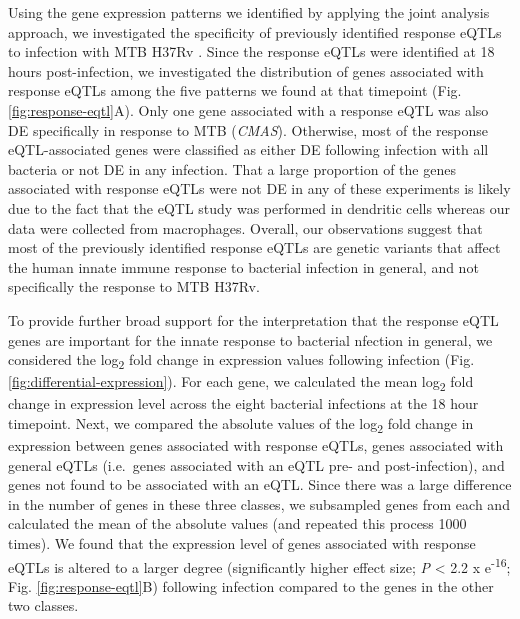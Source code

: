 Using the gene expression patterns we identified by applying the joint
analysis approach, we investigated the specificity of previously
identified response eQTLs to infection with MTB H37Rv
\citep{Barreiro2012}. Since the response eQTLs were identified at 18
hours post-infection, we investigated the distribution of genes
associated with response eQTLs among the five patterns we found at
that timepoint (Fig. \ref{fig:response-eqtl}A). Only one gene
associated with a response eQTL was also DE specifically in response
to MTB (\emph{CMAS}). Otherwise, most of the response eQTL-associated
genes were classified as either DE following infection with all
bacteria or not DE in any infection. That a large proportion of the
genes associated with response eQTLs were not DE in any of these
experiments is likely due to the fact that the eQTL study was
performed in dendritic cells whereas our data were collected from
macrophages. Overall, our observations suggest that most of the
previously identified response eQTLs are genetic variants that affect
the human innate immune response to bacterial infection in general,
and not specifically the response to MTB H37Rv.

To provide further broad support for the interpretation that the
response eQTL genes are important for the innate response to bacterial
nfection in general, we considered the log\textsubscript{2} fold
change in expression values following infection
(Fig. \ref{fig:differential-expression}). For each gene, we calculated
the mean log\textsubscript{2} fold change in expression level across
the eight bacterial infections at the 18 hour timepoint. Next, we
compared the absolute values of the log\textsubscript{2} fold change
in expression between genes associated with response eQTLs, genes
associated with general eQTLs (i.e.~genes associated with an eQTL pre-
and post-infection), and genes not found to be associated with an
eQTL.  Since there was a large difference in the number of genes in
these three classes, we subsampled genes from each and calculated the
mean of the absolute values (and repeated this process 1000 times). We
found that the expression level of genes associated with response
eQTLs is altered to a larger degree (significantly higher effect size;
\emph{P} \textless{} 2.2 x e\textsuperscript{-16};
Fig. \ref{fig:response-eqtl}B) following infection compared to the
genes in the other two classes.

